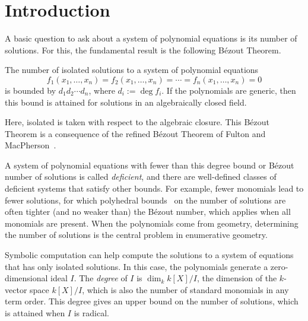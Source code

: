 \section{Introduction}
A basic question to ask about a system of polynomial equations is
its number of solutions.
For this, the fundamental result is the following  
B\'ezout Theorem.

\begin{theorem}
 The number of isolated solutions to a system of polynomial equations
$$
 f_1(x_1,\ldots,x_n)=f_2(x_1,\ldots,x_n)= \cdots
 =f_n(x_1,\ldots,x_n)=0
$$
 is bounded by $d_1d_2\cdots d_n$, where $d_i:=\deg f_i$.
 If the polynomials are generic, then this bound is attained for 
 solutions in an algebraically closed field.
\end{theorem}

Here, isolated is taken with respect to the algebraic closure.
This B\'ezout Theorem is a consequence of the refined B\'ezout Theorem of
Fulton and MacPherson~\cite[\S 1.23]{SO:Fu84a}.

A system of polynomial equations with fewer than this
degree bound or B\'ezout number of solutions is called
{\it deficient}, 
and there are well-defined classes of deficient systems that satisfy other
bounds.  
For example, fewer monomials lead to fewer solutions, for which polyhedral
bounds~\cite{SO:Bernstein} on the number of solutions are often tighter (and
no weaker than) the B\'ezout number, which applies when
all monomials are present.
When the polynomials come from geometry, determining the
number of solutions is the central problem in enumerative
geometry.

Symbolic computation can help compute the
solutions to a system of equations 
that has only isolated solutions.
In this case, the polynomials generate a zero-dimensional ideal
$I$. 
The {\it degree} of $I$ is $\dim_k k[X]/I$, the dimension of the 
$k$-vector space $k[X]/I$, which is also the
number of standard monomials in any term order.
This degree gives an upper bound on
the number of solutions, which is attained when $I$ is
radical. 

